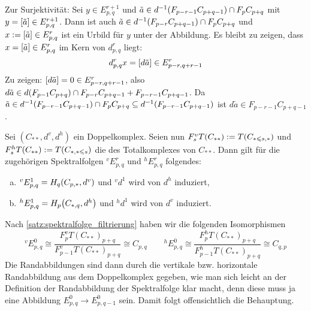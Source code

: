 \begin{beweis}
	Zur Surjektivität: Sei $y \in E^{r+1}_{p,q}$ und $\tilde{a} \in d^{-1} \enbrace*{F_{p-r-1} C_{p+q-1}}\cap F_p C_{p+q}$ mit $y = \benbrace*{\tilde{a}} \in E^{r+1}_{p,q}$.
	Dann ist auch $\tilde{a} \in d^{-1} \enbrace*{F_{p-r} C_{p+q-1}} \cap F_p C_{p+q}$ und $x := \benbrace*{\tilde{a}} \in E^r_{p,q}$ ist ein Urbild für $y$ unter der Abbildung.
	Es bleibt zu zeigen, dass $x =\benbrace*{\tilde{a}} \in E^r_{p,q}$ im Kern von $d^r_{p,q}$ liegt:
	\[
		d^r_{p,q} x = \benbrace*{d \tilde{a}} \in E^r_{p-r,q+r-1}
	\]
	Zu zeigen: $\benbrace*{d \tilde{a}} =0 \in E^r_{p-r,q+r-1}$, also $d \tilde{a} \in d \enbrace*{F_{p-1} C_{p+q}} \cap F_{p-r} C_{p+q-1} + F_{p-r-1} C_{p+q-1}$.
	Da $\tilde{a} \in d^{-1} \enbrace*{F_{p-r-1} C_{p+q-1}}\cap F_p C_{p+q} \subseteq d^{-1} (F_{p-r-1} C_{p+q-1})$ ist $d\tilde{a} \in F_{p-r-1} C_{p+q-1}$.
\end{beweis}

\begin{proposition}[{name=[{Spektralfolgen aus einem Totalkomplex}]},label=prop:spektral_total]
	Sei $(C_{**},d^v,d^h)$ ein Doppelkomplex.
	Seien nun $F^v_s T(C_{**}) := T \enbrace*{C_{*\le s,*}}$ und $F^h_s T(C_{**}) := T \enbrace*{C_{*,*\le s}}$ die  des Totalkomplexes von $C_{**}$.
	Dann gilt für die zugehörigen Spektralfolgen $^v E^r_{p,q}$ und $^h E^r_{p,q}$ folgendes:
	\begin{enumerate}[a)]
		\item $^v E^1_{p,q} = H_q \enbrace*{C_{p,*},d^v}$ und $^v d^1$ wird von $d^h$ induziert,
		\item $^h E^1_{p,q} = H_p \enbrace*{C_{*,q},d^h}$ und $^h d^1$ wird von $d^v$ induziert.
	\end{enumerate}
\end{proposition}
\begin{beweis}
	Nach \autoref{satz:spektralfolge_filtrierung} haben wir die folgenden Isomorphismen
	\[
		{^vE^0_{p,q}} \cong\frac{F_p^v T(C_{**})_{p+q}}{F_{p-1}^v T(C_{**})_{p+q}} \cong  C_{p,q} \qquad {^hE^0_{p,q}}\cong\frac{F^h_p T(C_{**})_{p+q}}{F_{p-1}^h T(C_{**})_{p+q}} \cong C_{q,p}
	\]
	Die Randabbildungen sind dann durch die vertikale bzw. horizontale Randabbildung aus dem Doppelkomplex gegeben, wie man sich leicht an der Definition der Randabbildung der Spektralfolge klar macht, denn diese muss ja eine Abbildung $E^0_{p,q} \to E^0_{p,q-1}$ sein.
	Damit folgt offensichtlich die Behauptung.
\end{beweis}

